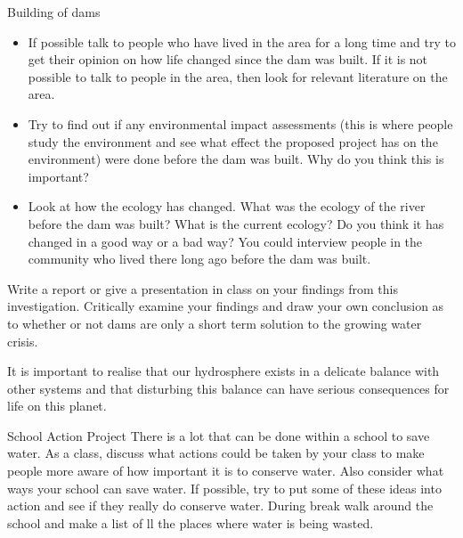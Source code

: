 \begin{Investigation}{Building of dams}
\label{m38138*id774}\begin{itemize}[noitemsep]
            \label{m38138*id034582}\item If possible talk to people who have lived in the area for a long time and try to get their opinion on how life changed since the dam was built. If it is not possible to talk to people in the area, then look for relevant literature on the area.
\label{m38138*id08323}\item Try to find out if any environmental impact assessments (this is where people study the environment and see what effect the proposed project has on the environment) were done before the dam was built. Why do you think this is important? 
\label{m38138*id0832346}\item 
Look at how the ecology has changed. What was the ecology of the river before the dam was built? What is the current ecology? Do you think it has changed in a good way or a bad way? You could interview people in the community who lived there long ago before the dam was built.
\end{itemize}
        \par 

\label{m38138*id08322432}
Write a report or give a presentation in class on your findings from this investigation. Critically examine your findings and draw your own conclusion as to whether or not dams are only a short term solution to the growing water crisis.

\par \end{Investigation}
      \label{m38138*id342412}It is important to realise that our hydrosphere exists in a delicate balance with other systems and that disturbing this balance can have serious consequences for life on this planet.\par 
\label{m38138*secfhsst!!!underscore!!!id1065}
            \begin{project}{School Action Project
      }
            \nopagebreak
      \label{m38138*id342430}There is a lot that can be done within a school to save water. As a class, discuss what actions could be taken by your class to make people more aware of how important it is to conserve water. Also consider what ways your school can save water. If possible, try to put some of these ideas into action and see if they really do conserve water. During break walk around the school and make a list of ll the places where water is being wasted.
 \par 
\end{project}
